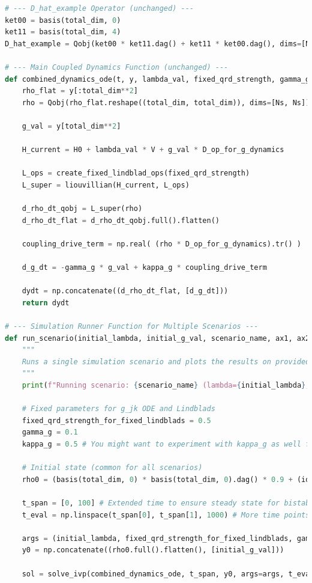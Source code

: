 \documentclass[9pt]{article}
\begin{document}
\begin{lstlisting}[language=Python, basicstyle=\ttfamily\footnotesize, breaklines=true, frame=single, caption={Python Code for Quantum-Classical Coupled Unbounded Dynamics}, label={lst:qrd_code}]
# --- D_hat_example Operator (unchanged) ---
ket00 = basis(total_dim, 0)
ket11 = basis(total_dim, 4)
D_hat_example = Qobj(ket00 * ket11.dag() + ket11 * ket00.dag(), dims=[Ns, Ns])

# --- Main Coupled Dynamics Function (unchanged) ---
def combined_dynamics_ode(t, y, lambda_val, fixed_qrd_strength, gamma_g, kappa_g, D_op_for_g_dynamics):
    rho_flat = y[:total_dim**2]
    rho = Qobj(rho_flat.reshape((total_dim, total_dim)), dims=[Ns, Ns])
    
    g_val = y[total_dim**2]

    H_current = H0 + lambda_val * V + g_val * D_op_for_g_dynamics
    
    L_ops = create_fixed_lindblad_ops(fixed_qrd_strength)
    L_super = liouvillian(H_current, L_ops)

    d_rho_dt_qobj = L_super(rho)
    d_rho_dt_flat = d_rho_dt_qobj.full().flatten()

    coupling_drive_term = np.real( (rho * D_op_for_g_dynamics).tr() )

    d_g_dt = -gamma_g * g_val + kappa_g * coupling_drive_term

    dydt = np.concatenate((d_rho_dt_flat, [d_g_dt]))
    return dydt

# --- Simulation Runner Function for Multiple Scenarios ---
def run_scenario(initial_lambda, initial_g_val, scenario_name, ax1, ax2, ax3):
    """
    Runs a single simulation scenario and plots the results on provided axes.
    """
    print(f"Running scenario: {scenario_name} (lambda={initial_lambda}, g_init={initial_g_val})")

    # Fixed parameters for g_jk ODE and Lindblads
    fixed_qrd_strength_for_fixed_lindblads = 0.5
    gamma_g = 0.1
    kappa_g = 0.5 # You might want to experiment with kappa_g as well for bistability!

    # Initial state (common for all scenarios)
    rho0 = (basis(total_dim, 0) * basis(total_dim, 0).dag() * 0.9 + (identity(total_dim) * 0.1 / total_dim)).unit()

    t_span = [0, 100] # Extended time to ensure steady state for bistability check
    t_eval = np.linspace(t_span[0], t_span[1], 1000) # More time points

    args = (initial_lambda, fixed_qrd_strength_for_fixed_lindblads, gamma_g, kappa_g, D_hat_example)
    y0 = np.concatenate((rho0.full().flatten(), [initial_g_val]))

    sol = solve_ivp(combined_dynamics_ode, t_span, y0, args=args, t_eval=t_eval, method='RK45', rtol=1e-6, atol=1e-8)


\end{lstlisting}
\end{document}
